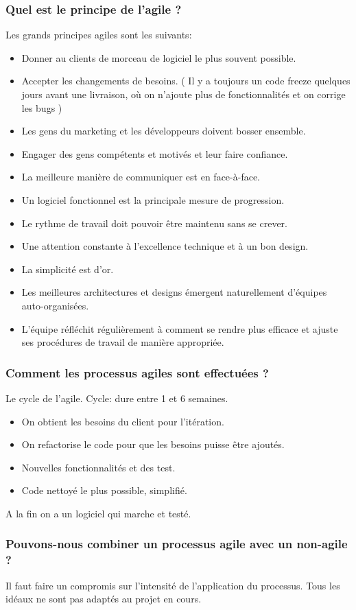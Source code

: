 \subsubsection{Quel est le principe de l'agile ?}
Les grands principes agiles sont les suivants:
\begin{itemize}
	\item Donner au clients de morceau de logiciel le plus souvent possible.
	\item Accepter les changements de besoins. ( Il y a toujours un code freeze quelques jours avant une livraison, où on n’ajoute plus de fonctionnalités et on corrige les bugs )
	\item Les gens du marketing et les développeurs doivent bosser ensemble.
	\item Engager des gens compétents et motivés et leur faire confiance.
	\item La meilleure manière de communiquer est en face-à-face.
	\item Un logiciel fonctionnel est la principale mesure de progression.
	\item Le rythme de travail doit pouvoir être maintenu sans se crever.
	\item Une attention constante à l’excellence technique et à un bon design.
	\item La simplicité est d’or.
	\item Les meilleures architectures et designs émergent naturellement d’équipes auto-organisées.
	\item L’équipe réfléchit régulièrement à comment se rendre plus efficace et ajuste ses procédures de travail de manière appropriée.
\end{itemize}



\subsubsection{Comment les processus agiles sont effectuées ?}
Le cycle de l'agile. Cycle: dure entre 1 et 6 semaines.
\begin{itemize}
	\item On obtient les besoins du client pour l’itération.
	\item On refactorise le code pour que les besoins puisse être ajoutés.
	\item Nouvelles fonctionnalités et des test.
	\item Code nettoyé le plus possible, simplifié.
\end{itemize}
A la fin on a un logiciel qui marche et testé.



\subsubsection{Pouvons-nous combiner un processus agile avec un non-agile ?}
Il faut faire un compromis sur l’intensité de l’application du processus. Tous les idéaux ne sont pas adaptés au projet en cours.
